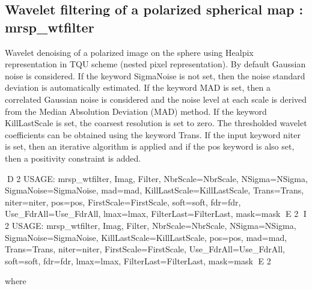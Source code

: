 \subsection{Wavelet filtering of a polarized spherical map : mrsp\_wtfilter}
Wavelet denoising of a polarized image on the sphere using Healpix representation in TQU scheme (nested pixel representation). 
By default Gaussian noise is considered. If the keyword SigmaNoise is not set, then the noise standard deviation is automatically 
estimated. If the keyword MAD is set, then a correlated Gaussian noise is considered and the noise level at each scale is derived 
from the Median Absolution Deviation (MAD) method. If the keyword KillLastScale is set, the coarsest resolution is set to zero. 
The thresholded wavelet coefficients can be obtained using the keyword Trans. If the input keyword niter is set, then an iterative 
algorithm is applied and if the pos keyword is also set, then a positivity constraint is added.
{\bf
\begin{center}
D 2
     USAGE:  mrsp\_wtfilter, Imag, Filter, NbrScale=NbrScale, NSigma=NSigma, SigmaNoise=SigmaNoise, mad=mad, 
     KillLastScale=KillLastScale, Trans=Trans, niter=niter, pos=pos, FirstScale=FirstScale, soft=soft, fdr=fdr, 
     Use\_FdrAll=Use\_FdrAll, lmax=lmax, FilterLast=FilterLast, mask=mask 
E 2
I 2
     USAGE:  mrsp\_wtfilter, Imag, Filter, NbrScale=NbrScale, NSigma=NSigma, SigmaNoise=SigmaNoise, KillLastScale=KillLastScale, 
     pos=pos, mad=mad, Trans=Trans, niter=niter, FirstScale=FirstScale, Use\_FdrAll=Use\_FdrAll, soft=soft, fdr=fdr, lmax=lmax, 
     FilterLast=FilterLast, mask=mask 
E 2
\end{center}}
where
